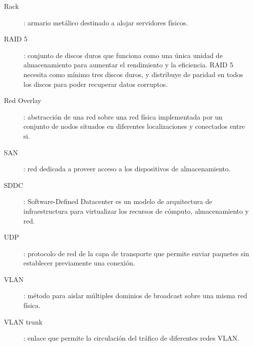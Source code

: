 \begin{description}
 \label{itm:qos}
 \item [Rack]: armario metálico destinado a alojar servidores físicos.
 \label{itm:rack}
 \item [RAID 5]: conjunto de discos duros que funciona como una única unidad de almacenamiento para aumentar el rendimiento y la eficiencia. RAID 5 necesita como mínimo tres discos duros, y distribuye de paridad en todos los discos para poder recuperar datos corruptos.
 \label{itm:raid5}
 \item [Red Overlay]\cite{overlay}: abstracción de una red sobre una red física implementada por un conjunto de nodos situados en diferentes localizaciones y conectados entre si.
 \label{itm:overlay}
 \item [SAN]: red dedicada a proveer acceso a los dispositivos de almacenamiento.
 \label{itm:san}
 \item [SDDC]\cite{sddc}: Software-Defined Datacenter es un modelo de  arquitectura de infraestructura para virtualizar los recursos de cómputo, almacenamiento y red.
 \label{itm:sddc}
 \item [UDP]: protocolo de red de la capa de transporte que permite enviar paquetes sin establecer previamente una conexión.
 \label{itm:udp}
 \item [VLAN]: método para aislar múltiples dominios de broadcast sobre una misma red física.
 \label{itm:vlan}
 \item [VLAN trunk]: enlace que permite la circulación del tráfico de diferentes redes VLAN.
 \label{itm:trunk}




\end{description}
